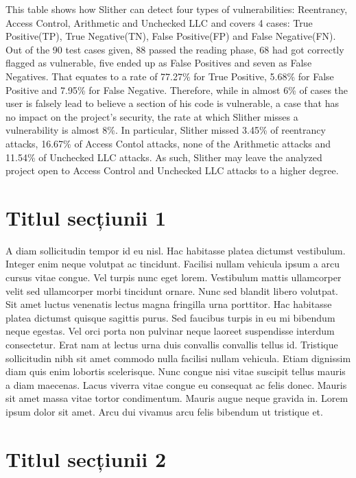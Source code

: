 This table shows how Slither can detect four types of vulnerabilities: Reentrancy, Access Control, Arithmetic and Unchecked LLC and covers 4 cases: True Positive(TP), True Negative(TN), False Positive(FP) and False Negative(FN). Out of the 90 test cases given, 88 passed the reading phase, 68 had got correctly flagged as vulnerable, five ended up as False Positives and seven as False Negatives. That equates to a rate of 77.27\% for True Positive, 5.68\% for False Positive and 7.95\% for False Negative. Therefore, while in almost 6\% of cases the user is falsely lead to believe a section of his code is vulnerable, a case that has no impact on the project's security, the rate at which Slither misses a vulnerability is almost 8\%. In particular, Slither missed 3.45\% of reentrancy attacks, 16.67\% of Access Contol attacks, none of the Arithmetic attacks and 11.54\% of Unchecked LLC attacks. As such, Slither may leave the analyzed project open to Access Control and Unchecked LLC attacks to a higher degree.
\section{Titlul secțiunii 1}

A diam sollicitudin tempor id eu nisl. Hac habitasse platea dictumst vestibulum. Integer enim neque volutpat ac tincidunt. Facilisi nullam vehicula ipsum a arcu cursus vitae congue. Vel turpis nunc eget lorem. Vestibulum mattis ullamcorper velit sed ullamcorper morbi tincidunt ornare. Nunc sed blandit libero volutpat. Sit amet luctus venenatis lectus magna fringilla urna porttitor. Hac habitasse platea dictumst quisque sagittis purus. Sed faucibus turpis in eu mi bibendum neque egestas. Vel orci porta non pulvinar neque laoreet suspendisse interdum consectetur. Erat nam at lectus urna duis convallis convallis tellus id. Tristique sollicitudin nibh sit amet commodo nulla facilisi nullam vehicula. Etiam dignissim diam quis enim lobortis scelerisque. Nunc congue nisi vitae suscipit tellus mauris a diam maecenas. Lacus viverra vitae congue eu consequat ac felis donec. Mauris sit amet massa vitae tortor condimentum. Mauris augue neque gravida in. Lorem ipsum dolor sit amet. Arcu dui vivamus arcu felis bibendum ut tristique et.

\section{Titlul secțiunii 2}

